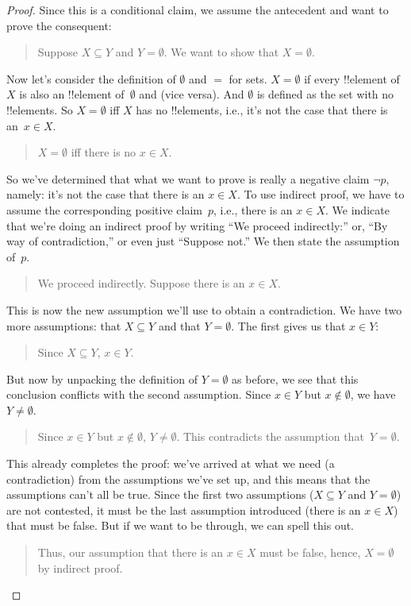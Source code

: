 \documentclass[../../../include/open-logic-section]{subfiles}
\begin{document}
\begin{proof}
Since this is a conditional claim, we assume the antecedent and want
to prove the consequent:
\begin{quote}
Suppose $X \subseteq Y$ and $Y = \emptyset$. We want to show that $X =
\emptyset$.
\end{quote}
Now let's consider the definition of $\emptyset$ and $=$ for sets. $X
= \emptyset$ if every !!{element} of~$X$ is also an !!{element}
of~$\emptyset$ and (vice versa). And $\emptyset$ is defined as the set
with no !!{element}s. So $X = \emptyset$ iff $X$ has no !!{element}s,
i.e., it's not the case that there is an~$x \in X$.
\begin{quote}
$X = \emptyset$ iff there is no $x \in X$.
\end{quote}
So we've determined that what we want to prove is really a negative
claim $\lnot p$, namely: it's not the case that there is an $x \in X$.
To use indirect proof, we have to assume the corresponding positive
claim~$p$, i.e., there is an $x \in X$.  We indicate that we're doing
an indirect proof by writing ``We proceed indirectly:'' or, ``By way
of contradiction,'' or even just ``Suppose not.'' We then state the
assumption of~$p$.
\begin{quote}
We proceed indirectly. Suppose there is an $x \in X$.
\end{quote}
This is now the new assumption we'll use to obtain a contradiction. We
have two more assumptions: that $X \subseteq Y$ and that $Y =
\emptyset$. The first gives us that $x \in Y$:
\begin{quote}
Since $X \subseteq Y$, $x \in Y$.
\end{quote}
But now by unpacking the definition of $Y = \emptyset$ as before, we
see that this conclusion conflicts with the second assumption. Since
$x \in Y$ but $x \notin \emptyset$, we have $Y \neq \emptyset$.
\begin{quote}
Since $x \in Y$ but $x \notin \emptyset$, $Y \neq \emptyset$. This
contradicts the assumption that~$Y = \emptyset$.
\end{quote}
This already completes the proof: we've arrived at what we need (a
contradiction) from the assumptions we've set up, and this means that
the assumptions can't all be true. Since the first two assumptions ($X
\subseteq Y$ and $Y = \emptyset$) are not contested, it must be the
last assumption introduced (there is an $x \in X$) that must be
false. But if we want to be through, we can spell this out.
\begin{quote}
Thus, our assumption that there is an $x \in X$ must be false, hence,
$X = \emptyset$ by indirect proof. \qedhere
\end{quote}
\end{proof}
\end{document}
